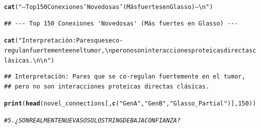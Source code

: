 \documentclass{article}\usepackage[]{graphicx}\usepackage[]{xcolor}
\makeatletter
\newcommand{\hlnum}[1]{\textcolor[rgb]{0.686,0.059,0.569}{#1}}%
\newcommand{\hlsng}[1]{\textcolor[rgb]{0.192,0.494,0.8}{#1}}%
\newcommand{\hlcom}[1]{\textcolor[rgb]{0.678,0.584,0.686}{\textit{#1}}}%
\newcommand{\hldef}[1]{\textcolor[rgb]{0.345,0.345,0.345}{#1}}%
\newcommand{\hlkwd}[1]{\textcolor[rgb]{0.737,0.353,0.396}{\textbf{#1}}}%
\newenvironment{kframe}{%
 \def\at@end@of@kframe{}%
 \ifinner\ifhmode%
  \def\at@end@of@kframe{\end{minipage}}%
  \begin{minipage}{\columnwidth}%
 \fi\fi%
 \def\FrameCommand##1{\hskip\@totalleftmargin \hskip-\fboxsep
 \colorbox{shadecolor}{##1}\hskip-\fboxsep
     \hskip-\linewidth \hskip-\@totalleftmargin \hskip\columnwidth}%
 \MakeFramed {\advance\hsize-\width
   \@totalleftmargin\z@ \linewidth\hsize
   \@setminipage}}%
 {\par\unskip\endMakeFramed%
 \at@end@of@kframe}
\newenvironment{knitrout}{}{} %
\makeatother
\begin{document}
\begin{knitrout}
\color{fgcolor}\begin{kframe}
\begin{alltt}
\hlkwd{cat}\hldef{(}\hlsng{"--- Top 150 Conexiones 'Novedosas' (Más fuertes en Glasso) ---\textbackslash{}n"}\hldef{)}
\end{alltt}
\begin{verbatim}
## --- Top 150 Conexiones 'Novedosas' (Más fuertes en Glasso) ---
\end{verbatim}
\begin{alltt}
\hlkwd{cat}\hldef{(}\hlsng{"Interpretación: Pares que se co-regulan fuertemente en el tumor, \textbackslash{}npero no son interacciones proteicas directas clásicas.\textbackslash{}n\textbackslash{}n"}\hldef{)}
\end{alltt}
\begin{verbatim}
## Interpretación: Pares que se co-regulan fuertemente en el tumor, 
## pero no son interacciones proteicas directas clásicas.
\end{verbatim}
\begin{alltt}
\hlkwd{print}\hldef{(}\hlkwd{head}\hldef{(novel_connections[,} \hlkwd{c}\hldef{(}\hlsng{"GenA"}\hldef{,} \hlsng{"GenB"}\hldef{,} \hlsng{"Glasso_Partial"}\hldef{)],} \hlnum{150}\hldef{))}
\end{alltt}


{\ttfamily\noindent\bfseries\color{errorcolor}{\#\# Error in h(simpleError(msg, call)): error in evaluating the argument 'x' in selecting a method for function 'head': object 'novel\_connections' not found}}\begin{alltt}
\hlcom{# 5. ¿SON REALMENTE NUEVAS O SOLO STRING DE BAJA CONFIANZA?}
\end{alltt}
\end{kframe}
\end{knitrout}
\end{document}
